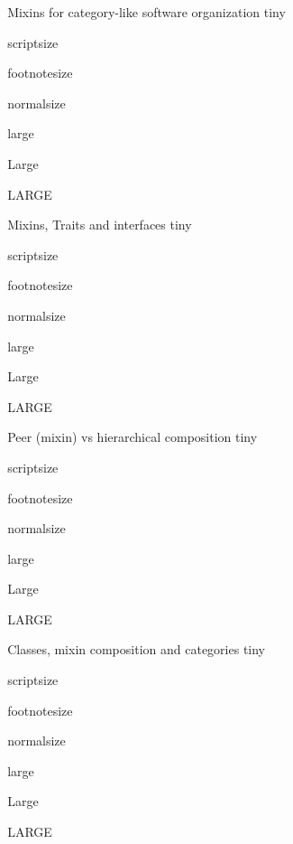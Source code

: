 \documentclass[final]{beamer}
\begin{document}
\begin{frame}[fragile]
\begin{columns}[t]
\begin{column}{.3\linewidth}
\end{column}

\begin{column}{.3\linewidth}
 
  \begin{block}{\large Mixins for category-like software organization}
      \centering
      {\tiny tiny}\par
      {\scriptsize scriptsize}\par
      {\footnotesize footnotesize}\par
      {\normalsize normalsize}\par
      {\large large}\par
      {\Large Large}\par
      {\LARGE LARGE}\par
  \end{block}
  \hfill
  \begin{block}{\large Mixins, Traits and interfaces}
      \centering
      {\tiny tiny}\par
      {\scriptsize scriptsize}\par
      {\footnotesize footnotesize}\par
      {\normalsize normalsize}\par
      {\large large}\par
      {\Large Large}\par
      {\LARGE LARGE}\par
  \end{block}
  \hfill
  \begin{block}{\large Peer (mixin) vs hierarchical composition}
      \centering
      {\tiny tiny}\par
      {\scriptsize scriptsize}\par
      {\footnotesize footnotesize}\par
      {\normalsize normalsize}\par
      {\large large}\par
      {\Large Large}\par
      {\LARGE LARGE}\par
  \end{block}
  \hfill
  \begin{block}{\large Classes, mixin composition and categories}
      \centering
      {\tiny tiny}\par
      {\scriptsize scriptsize}\par
      {\footnotesize footnotesize}\par
      {\normalsize normalsize}\par
      {\large large}\par
      {\Large Large}\par
      {\LARGE LARGE}\par
  \end{block}

\end{column}

\end{columns}

\vfill
\end{frame}
\end{document}
